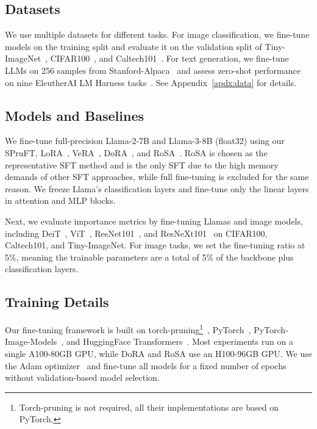 



\subsection{Datasets} \label{subsec:dataset}
We use multiple datasets for different tasks. For image classification, we fine-tune models on the training split and evaluate it on the validation split of Tiny-ImageNet~\citep{tavanaei2020embedded}, CIFAR100~\citep{alex2009learning}, and Caltech101~\citep{li_andreeto_ranzato_perona_2022}. For text generation, we fine-tune LLMs on 256 samples from Stanford-Alpaca~\citep{alpaca} and assess zero-shot performance on nine EleutherAI LM Harness tasks~\citep{gao2021framework}. See Appendix~\ref{apdx:data} for details.

\subsection{Models and Baselines} \label{subsec:models}

We fine-tune full-precision Llama-2-7B and Llama-3-8B (float32) using our SPruFT, LoRA~\citep{hulora}, VeRA~\citep{kopiczko2024vera}, DoRA~\citep{liu2024dora}, and RoSA~\citep{nikdan2024rosa}. RoSA is chosen as the representative SFT method and is the only SFT due to the high memory demands of other SFT approaches, while full fine-tuning is excluded for the same reason. We freeze Llama’s classification layers and fine-tune only the linear layers in attention and MLP blocks.

Next, we evaluate importance metrics by fine-tuning Llamas and image models, including DeiT~\citep{touvron2021training}, ViT~\citep{dosovitskiy2020image}, ResNet101~\citep{he2016deep}, and ResNeXt101~\citep{xie2017aggregated} on CIFAR100, Caltech101, and Tiny-ImageNet. For image tasks, we set the fine-tuning ratio at 5\%, meaning the trainable parameters are a total of 5\% of the backbone plus classification layers.

\subsection{Training Details} \label{subsec:training}
Our fine-tuning framework is built on torch-pruning\footnote{Torch-pruning is not required, all their implementations are based on PyTorch.}~\citep{fang2023depgraph}, PyTorch~\citep{paszke2019pytorch}, PyTorch-Image-Models~\citep{rw2019timm}, and HuggingFace Transformers~\citep{wolf2020transformers}. Most experiments run on a single A100-80GB GPU, while DoRA and RoSA use an H100-96GB GPU. We use the Adam optimizer~\citep{KingBa15} and fine-tune all models for a fixed number of epochs without validation-based model selection.

